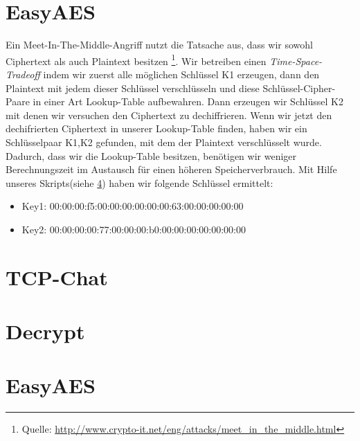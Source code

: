 \documentclass[a4paper,12bpt]{scrartcl}
\begin{document}
\section{EasyAES}
\label{sec:EasyAES}

  Ein Meet-In-The-Middle-Angriff nutzt die Tatsache aus, dass wir sowohl Ciphertext als auch Plaintext besitzen
  \footnote{Quelle: \url{http://www.crypto-it.net/eng/attacks/meet_in_the_middle.html}}.
  Wir betreiben einen \textit{Time-Space-Tradeoff} indem wir zuerst alle möglichen Schlüssel  K1 erzeugen, dann
  den Plaintext mit jedem dieser Schlüssel verschlüsseln und diese Schlüssel-Cipher-Paare in einer Art
  Lookup-Table aufbewahren. Dann erzeugen wir Schlüssel K2 mit denen wir versuchen den Ciphertext zu dechiffrieren.
  Wenn wir jetzt den dechifrierten Ciphertext in unserer Lookup-Table finden, haben wir ein Schlüsselpaar K1,K2
  gefunden, mit dem der Plaintext verschlüsselt wurde. Dadurch, dass wir die Lookup-Table besitzen, benötigen
  wir weniger Berechnungszeit im Austausch für einen höheren Speicherverbrauch.
  Mit Hilfe unseres Skripts(siehe \ref{sec:EasyAES}) haben wir folgende Schlüssel ermittelt:
  \begin{itemize}
    \item[] Key1: 00:00:00:f5:00:00:00:00:00:00:63:00:00:00:00:00
    \item[] Key2: 00:00:00:00:77:00:00:00:b0:00:00:00:00:00:00:00
  \end{itemize}

\begin{appendices}
    \section{TCP-Chat}
    \label{sec:TCP-Chat}
    
    
    

    \section{Decrypt}
    \label{sec:Decrypt}
    
    

    \section{EasyAES}
    \label{sec:EasyAES}
    
\end{appendices}
\end{document}
